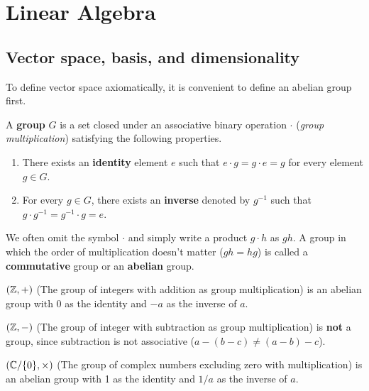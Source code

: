 \section{Linear Algebra}\label{sec:A01}

\subsection{Vector space, basis, and dimensionality}

To define vector space axiomatically, it is convenient to define an abelian group first.

\begin{definition}
	A {\bf group} $G$ is a set closed under an associative binary operation $\cdot$ (\emph{group multiplication}) satisfying the following properties.
	\begin{enumerate}
		\item There exists an {\bf identity} element $e$ such that $e\cdot g = g\cdot e = g$ for every element $g\in G$.
		\item For every $g\in G$, there exists an {\bf inverse} denoted by $g^{-1}$ such that $g\cdot g^{-1} = g^{-1}\cdot g = e$. 
	\end{enumerate}
\end{definition}
\noindent We often omit the symbol $\cdot$ and simply write a product $g\cdot h$ as $gh$.
A group in which the order of multiplication doesn't matter ($gh=hg$) is called a {\bf commutative} group or an {\bf abelian} group.
\begin{example}
	$(\mathbb Z,+)$ (The group of integers with addition as group multiplication) is an abelian group with 0 as the identity and $-a$ as the inverse of $a$.
\end{example}
\begin{example}
	$(\mathbb Z,-)$ (The group of integer with subtraction as group multiplication) is {\bf not} a group, since subtraction is not associative ($a-(b-c) \neq (a-b)-c$).
\end{example}
{\color{red}
\begin{example}
	$(\mathbb C/\{0\},\times)$ (The group of complex numbers excluding zero with multiplication) is an abelian group with 1 as the identity and $1/a$ as the inverse of $a$.
\end{example}
}
